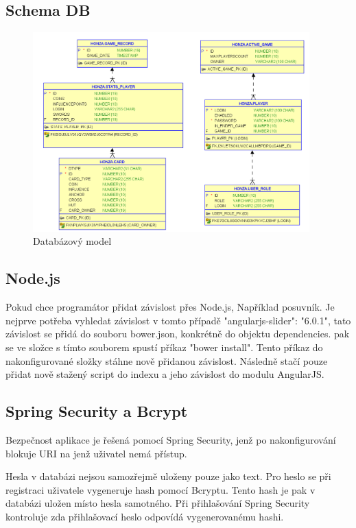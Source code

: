 \documentclass[czech,master,public,dept460,male,cpdeclaration,twoside]{diploma}
\begin{document}
\subsection{Schema DB}
\begin{figure}[H]
\centering\includegraphics[width=0.95\textwidth]{Figures/DBmodel.png}\caption{Databázový model}
\end{figure}

\subsection{Node.js}
Pokud chce programátor přidat závislost přes Node.js, Například posuvník. Je nejprve potřeba vyhledat závislost v tomto případě "angularjs-slider": "6.0.1", tato závislost se přidá do souboru bower.json, konkrétně do objektu dependencies. pak se ve složce s tímto souborem spustí příkaz "bower install". Tento příkaz do nakonfigurované složky stáhne nově přidanou závislost. Následně stačí pouze přidat nově stažený script do indexu a jeho závislost do modulu AngularJS. 

\subsection{Spring Security a Bcrypt}
Bezpečnost aplikace je řešená pomocí Spring Security, jenž po nakonfigurování blokuje URI na jenž uživatel nemá přístup.

Hesla v databázi nejsou samozřejmě uloženy pouze jako text. Pro heslo se při registraci uživatele vygeneruje hash pomocí Bcryptu. Tento hash je pak v databázi uložen místo hesla samotného. Při přihlašování Spring Security kontroluje zda přihlašovací heslo odpovídá vygenerovanému hashi.
\end{document}
